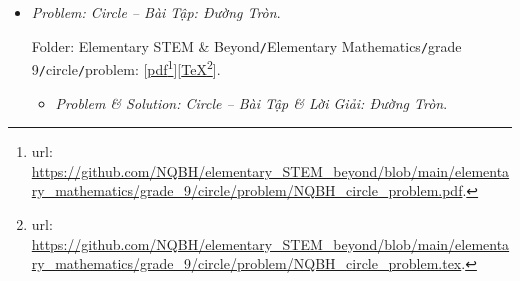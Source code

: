 \documentclass[12pt]{article}
\begin{document}
\begin{itemize}
	Folder: {\sf Elementary STEM \& Beyond{\tt/}Elementary Mathematics{\tt/}grade 9{\tt/}trigonometry triangle{\tt/}problem}: [\href{https://github.com/NQBH/elementary_STEM_beyond/blob/main/elementary_mathematics/grade_9/trigonometry/problem/NQBH_trigonometry_problem.pdf}{pdf}\footnote{{\sc url}: \url{https://github.com/NQBH/elementary_STEM_beyond/blob/main/elementary_mathematics/grade_9/trigonometry/problem/NQBH_trigonometry_problem.pdf}.}][\href{https://github.com/NQBH/elementary_STEM_beyond/blob/main/elementary_mathematics/grade_9/trigonometry/problem/NQBH_trigonometry_problem.tex}{\TeX}\footnote{{\sc url}: \url{https://github.com/NQBH/elementary_STEM_beyond/blob/main/elementary_mathematics/grade_9/trigonometry/problem/NQBH_trigonometry_problem.tex}.}].
	\begin{itemize}
		\item {\it Problem \& Solution: Trigonometry in Triangles -- Bài Tập \& Lời Giải: Hệ Thức Lượng Trong Tam Giác $\sin\alpha,\cos\alpha,\tan\alpha,\cot\alpha$}.
		
		Folder: {\sf Elementary STEM \& Beyond{\tt/}Elementary Mathematics{\tt/}grade 9{\tt/}trigonometry triangle{\tt/}solution}: [\href{https://github.com/NQBH/elementary_STEM_beyond/blob/main/elementary_mathematics/grade_9/trigonometry/solution/NQBH_trigonometry_solution.pdf}{pdf}\footnote{{\sc url}: \url{https://github.com/NQBH/elementary_STEM_beyond/blob/main/elementary_mathematics/grade_9/trigonometry/solution/NQBH_trigonometry_solution.pdf}.}][\href{https://github.com/NQBH/elementary_STEM_beyond/blob/main/elementary_mathematics/grade_9/trigonometry/solution/NQBH_trigonometry_solution.tex}{\TeX}\footnote{{\sc url}: \url{https://github.com/NQBH/elementary_STEM_beyond/blob/main/elementary_mathematics/grade_9/trigonometry/solution/NQBH_trigonometry_solution.tex}.}].
	\end{itemize}
	\item {\it Problem: Circle -- Bài Tập: Đường Tròn}.
	
	Folder: {\sf Elementary STEM \& Beyond{\tt/}Elementary Mathematics{\tt/}grade 9{\tt/}circle{\tt/}problem}: [\href{https://github.com/NQBH/elementary_STEM_beyond/blob/main/elementary_mathematics/grade_9/circle/problem/NQBH_circle_problem.pdf}{pdf}\footnote{{\sc url}: \url{https://github.com/NQBH/elementary_STEM_beyond/blob/main/elementary_mathematics/grade_9/circle/problem/NQBH_circle_problem.pdf}.}][\href{https://github.com/NQBH/elementary_STEM_beyond/blob/main/elementary_mathematics/grade_9/circle/problem/NQBH_circle_problem.tex}{\TeX}\footnote{{\sc url}: \url{https://github.com/NQBH/elementary_STEM_beyond/blob/main/elementary_mathematics/grade_9/circle/problem/NQBH_circle_problem.tex}.}].
	\begin{itemize}
		\item {\it Problem \& Solution: Circle -- Bài Tập \& Lời Giải: Đường Tròn}.
		

\end{itemize}
\end{itemize}
\end{document}
